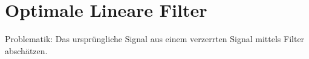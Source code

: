 



\chapter{Optimale Lineare Filter}
Problematik: Das ursprüngliche Signal aus einem verzerrten Signal mittels Filter abschätzen.

